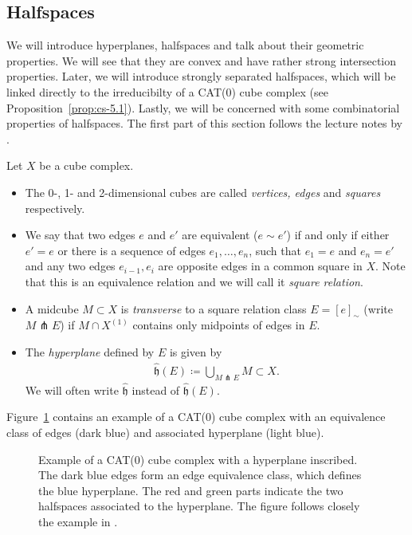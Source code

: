 \subsection{Halfspaces}
\label{sec:halfspaces}
We will introduce hyperplanes, halfspaces and talk about their geometric properties. We will see that they are convex and have rather strong intersection properties. Later, we will introduce strongly separated halfspaces, which will be linked directly to the irreducibilty of a CAT(0) cube complex (see Proposition~\ref{prop:cs-5.1}). Lastly, we will be concerned with some combinatorial properties of halfspaces. The first part of this section follows the lecture notes by \textcite{Rolli2012}.

\begin{defin}[Hyperplanes]
  Let \(X\) be a cube complex.
  \begin{itemize}
  \item The 0-, 1- and 2-dimensional cubes are called \emph{vertices, edges} and \emph{squares} respectively.
  \item We say that two edges \(e\) and \(e'\) are equivalent (\(e \sim e'\)) if and only if either \(e' = e\) or there is a sequence of edges \(e_1, \dots, e_n\), such that \(e_1 = e\) and \(e_n = e'\) and any two edges \(e_{i-1}, e_i\) are opposite edges in a common square in \(X\). Note that this is an equivalence relation and we will call it \emph{square relation}.
  \item A midcube \(M \subset X\) is \emph{transverse} to a square relation class \(E = [e]_\sim\) (write \(M \pitchfork E\)) if \(M \cap X^{(1)}\) contains only midpoints of edges in \(E\).
  \item The \emph{hyperplane} defined by \(E\) is given by
    \begin{align*}
      \mathfrak{\hat h}(E) \coloneqq \bigcup_{M \pitchfork E} M \subset X.
    \end{align*}
    We will often write \(\mathfrak{\hat h}\) instead of \(\mathfrak{\hat h}(E)\).
  \end{itemize}
\end{defin}

\begin{bsp}
  Figure~\ref{fig:hyperplanes} contains an example of a CAT(0) cube complex with an equivalence class of edges (dark blue) and associated hyperplane (light blue). 
  \begin{figure}[htbp]
    \centering
    
    \caption{Example of a CAT(0) cube complex with a hyperplane inscribed. The dark blue edges form an edge equivalence class, which defines the blue hyperplane. The red and green parts indicate the two halfspaces associated to the hyperplane. The figure follows closely the example in \textcite{sageev-lecture-notes}.}
    \label{fig:hyperplanes}
  \end{figure}
\end{bsp}

